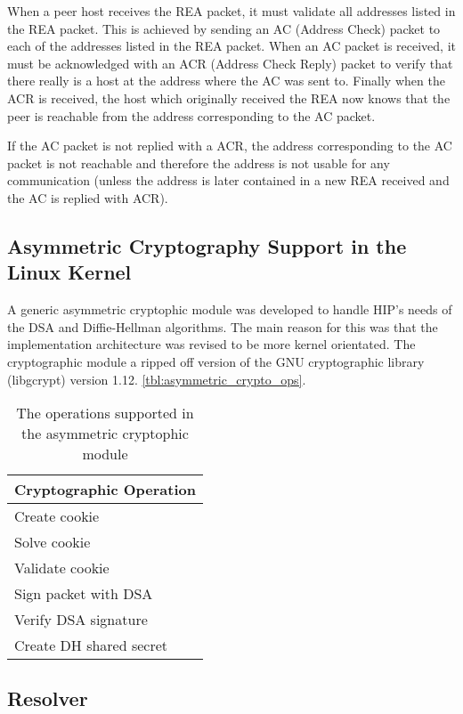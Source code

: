 When a peer host receives the REA packet, it must validate all
addresses listed in the REA packet. This is achieved by sending an AC
(Address Check) packet to each of the addresses listed in the REA
packet. When an AC packet is received, it must be acknowledged with an
ACR (Address Check Reply) packet to verify that there really is a host
at the address where the AC was sent to. Finally when the ACR is
received, the host which originally received the REA now knows that
the peer is reachable from the address corresponding to the AC packet.

If the AC packet is not replied with a ACR, the address corresponding
to the AC packet is not reachable and therefore the address is not
usable for any communication (unless the address is later contained in
a new REA received and the AC is replied with ACR).

\subsection{Asymmetric Cryptography Support in the Linux Kernel}


A generic asymmetric cryptophic module was developed to handle HIP's
needs of the DSA and Diffie-Hellman algorithms. The main reason for
this was that the implementation architecture was revised to be more
kernel orientated. The cryptographic module a ripped off version of
the GNU cryptographic library (libgcrypt) version 1.12.
\autoref{tbl:asymmetric_crypto_ops}.

\begin{table}[htb]
\centering
\begin{tabular}{|l|}\hline
Cryptographic Operation \\\hline
Create cookie  \\
Solve cookie \\
Validate cookie \\
Sign packet with DSA \\
Verify DSA signature \\
Create DH shared secret \\
\hline
\end{tabular}
\caption{The operations supported in the asymmetric cryptophic module}
\label{tbl:asymmetric_crypto_ops}
\end{table}

\subsection{Resolver}
\label{sec:resolver_architecture}

